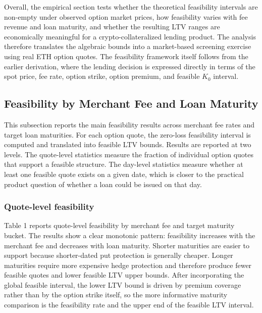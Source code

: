\documentclass[11pt]{article}
\begin{document}
Overall, the empirical section tests whether the theoretical feasibility intervals are non-empty under observed option market prices, how feasibility varies with fee revenue and loan maturity, and whether the resulting LTV ranges are economically meaningful for a crypto-collateralized lending product. The analysis therefore translates the algebraic bounds into a market-based screening exercise using real ETH option quotes. The feasibility framework itself follows from the earlier derivation, where the lending decision is expressed directly in terms of the spot price, fee rate, option strike, option premium, and feasible $K_0$ interval.

\subsection{Feasibility by Merchant Fee and Loan Maturity}

This subsection reports the main feasibility results across merchant fee rates and target loan maturities. For each option quote, the zero-loss feasibility interval is computed and translated into feasible LTV bounds. Results are reported at two levels. The quote-level statistics measure the fraction of individual option quotes that support a feasible structure. The day-level statistics measure whether at least one feasible quote exists on a given date, which is closer to the practical product question of whether a loan could be issued on that day.

\subsubsection{Quote-level feasibility}

Table 1 reports quote-level feasibility by merchant fee and target maturity bucket. The results show a clear monotonic pattern: feasibility increases with the merchant fee and decreases with loan maturity. Shorter maturities are easier to support because shorter-dated put protection is generally cheaper. Longer maturities require more expensive hedge protection and therefore produce fewer feasible quotes and lower feasible LTV upper bounds. After incorporating the global feasible interval, the lower LTV bound is driven by premium coverage rather than by the option strike itself, so the more informative maturity comparison is the feasibility rate and the upper end of the feasible LTV interval.
\end{document}
